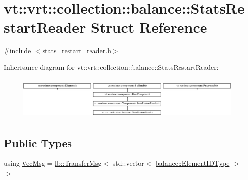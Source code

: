 \hypertarget{structvt_1_1vrt_1_1collection_1_1balance_1_1_stats_restart_reader}{}\section{vt\+:\+:vrt\+:\+:collection\+:\+:balance\+:\+:Stats\+Restart\+Reader Struct Reference}
\label{structvt_1_1vrt_1_1collection_1_1balance_1_1_stats_restart_reader}


{\ttfamily \#include $<$stats\+\_\+restart\+\_\+reader.\+h$>$}

Inheritance diagram for vt\+:\+:vrt\+:\+:collection\+:\+:balance\+:\+:Stats\+Restart\+Reader\+:\begin{figure}[H]
\begin{center}
\leavevmode
\includegraphics[height=2.170543cm]{structvt_1_1vrt_1_1collection_1_1balance_1_1_stats_restart_reader}
\end{center}
\end{figure}
\subsection*{Public Types}
\begin{DoxyCompactItemize}
\item 
using \hyperlink{structvt_1_1vrt_1_1collection_1_1balance_1_1_stats_restart_reader_a7e2a74977e595242bf3abb6c83b7e27b}{Vec\+Msg} = \hyperlink{structvt_1_1vrt_1_1collection_1_1lb_1_1_transfer_msg}{lb\+::\+Transfer\+Msg}$<$ std\+::vector$<$ \hyperlink{namespacevt_1_1vrt_1_1collection_1_1balance_a14c8d2c972f2913aa3f1636e5be0a120}{balance\+::\+Element\+I\+D\+Type} $>$ $>$
\end{DoxyCompactItemize}
